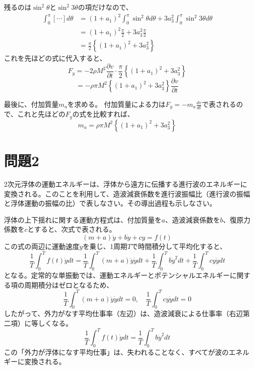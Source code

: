 \documentclass[11pt, dvipdfmx]{jsarticle}
\begin{document}
残るのは$\sin^2\theta$と$\sin^2 3\theta$の項だけなので、
\begin{align*}
    \int_0^\pi \left[ \cdots \right] d\theta &= (1+a_1)^2 \int_0^\pi \sin^2\theta d\theta + 3a_3^2 \int_0^\pi \sin^2 3\theta d\theta \\
    &= (1+a_1)^2 \frac{\pi}{2} + 3a_3^2 \frac{\pi}{2} \\
    &= \frac{\pi}{2} \left\{ (1+a_1)^2 + 3a_3^2 \right\}
\end{align*}
これを先ほどの式に代入すると、
$$
F_y = -2 \rho M^2 \frac{\partial v}{\partial t} \cdot \frac{\pi}{2} \left\{ (1+a_1)^2 + 3a_3^2 \right\}
$$
$$
= -\rho \pi M^2 \left\{ (1+a_1)^2 + 3a_3^2 \right\} \frac{\partial v}{\partial t}
$$


最後に、付加質量$m_a$を求める。
付加質量による力は$F_y = -m_a \frac{dv}{dt}$で表されるので、これと先ほどの$F_y$の式を比較すれば、
$$
m_a = \rho \pi M^2 \left\{ (1+a_1)^2 + 3a_3^2 \right\}
$$

\section{問題2}
2次元浮体の運動エネルギーは、浮体から遠方に伝播する進行波のエネルギーに変換される。このことを利用して、造波減衰係数を進行波振幅比（進行波の振幅と浮体運動の振幅の比）で表しなさい。その導出過程も示しなさい。

\vspace{1cm}

浮体の上下揺れに関する運動方程式は、付加質量を$a$、造波減衰係数を$b$、復原力係数を$c$とすると、次式で表される。
$$
(m+a)\ddot{y} + b\dot{y} + cy = f(t)
$$
この式の両辺に運動速度$\dot{y}$を乗じ、1周期$T$で時間積分して平均化すると、
$$
\frac{1}{T}\int_0^T f(t)\dot{y}dt = \frac{1}{T}\int_0^T (m+a)\ddot{y}\dot{y}dt + \frac{1}{T}\int_0^T b\dot{y}^2dt + \frac{1}{T}\int_0^T cy\dot{y}dt
$$
となる。定常的な単振動では、運動エネルギーとポテンシャルエネルギーに関する項の周期積分はゼロとなるため、
$$
\frac{1}{T}\int_0^T (m+a)\ddot{y}\dot{y}dt = 0, \quad \frac{1}{T}\int_0^T cy\dot{y}dt = 0
$$
したがって、外力がなす平均仕事率（左辺）は、造波減衰による仕事率（右辺第二項）に等しくなる。
$$
\frac{1}{T}\int_0^T f(t)\dot{y}dt = \frac{1}{T}\int_0^T b\dot{y}^2dt
$$
この「外力が浮体になす平均仕事」は、失われることなく、すべてが波のエネルギーに変換される。
\end{document}
